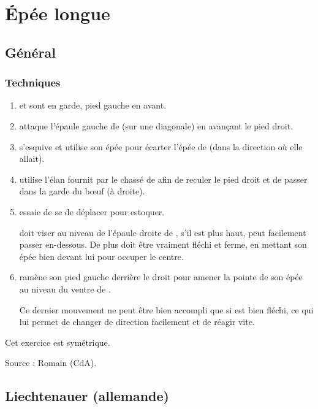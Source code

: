 \chapter{Épée longue}

\section{Général}

\subsection{Techniques}

\begin{exercice}
\begin{enumerate}
	\item \A et \D sont en garde, pied gauche en avant.
	
	\item \A attaque l'épaule gauche de \D (sur une diagonale) en avançant le pied droit.
	
	\item \D s'esquive et utilise son épée pour écarter l'épée de \A (dans la direction où elle allait).
	
	\item \A utilise l'élan fournit par le chassé de \D afin de reculer le pied droit et de passer dans la garde du bœuf (à droite).
	
	\item \D essaie de se de déplacer pour estoquer.
	
	\A doit viser au niveau de l'épaule droite de \D, s'il est plus haut, \D peut facilement passer en-dessous. De plus \A doit être vraiment fléchi et ferme, en mettant son épée bien devant lui pour occuper le centre.
	
	\item \A ramène son pied gauche derrière le droit pour amener la pointe de son épée au niveau du ventre de \D.
	
	Ce dernier mouvement ne peut être bien accompli que si \A est bien fléchi, ce qui lui permet de changer de direction facilement et de réagir vite.
\end{enumerate}

Cet exercice est symétrique.

Source : Romain (CdA).
\end{exercice}

\section{Liechtenauer (allemande)}

